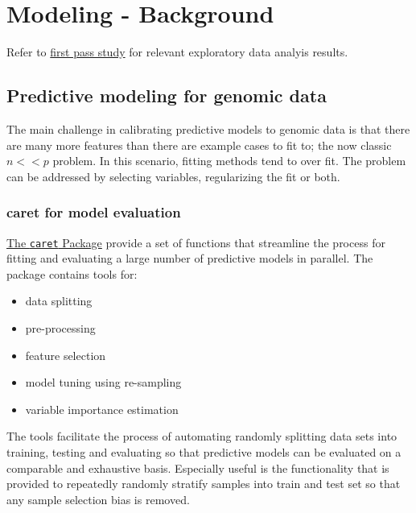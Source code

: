 \documentclass[
]{book}
\providecommand{\tightlist}{%
  \setlength{\itemsep}{0pt}\setlength{\parskip}{0pt}}
\begin{document}
\hypertarget{modeling-background}{%
\chapter{Modeling - Background}\label{modeling-background}}

Refer to \href{https://hcc-5hmc-analysis.netlify.app/}{first pass study} for
relevant exploratory data analyis results.

\hypertarget{predictive-modeling-for-genomic-data}{%
\section{Predictive modeling for genomic data}\label{predictive-modeling-for-genomic-data}}

The main challenge in calibrating predictive models to genomic data is that
there are many more features than there are example cases to fit to;
the now classic \(n << p\) problem.
In this scenario, fitting methods tend to over fit. The problem
can be addressed by selecting variables, regularizing the fit or both.

\hypertarget{caret-for-model-evaluation}{%
\subsection{caret for model evaluation}\label{caret-for-model-evaluation}}

\href{https://topepo.github.io/caret/index.html}{The \texttt{caret} Package}
provide a set of functions that streamline the process for fitting and
evaluating a large number of predictive models in parallel. The package contains tools for:

\begin{itemize}
\tightlist
\item
  data splitting\\
\item
  pre-processing\\
\item
  feature selection\\
\item
  model tuning using re-sampling\\
\item
  variable importance estimation
\end{itemize}

The tools facilitate the process of automating randomly splitting data sets into training,
testing and evaluating so that predictive models can be evaluated on a comparable and
exhaustive basis. Especially useful is the functionality that is provided to
repeatedly randomly stratify samples into train and test set so that any
sample selection bias is removed.
\end{document}
